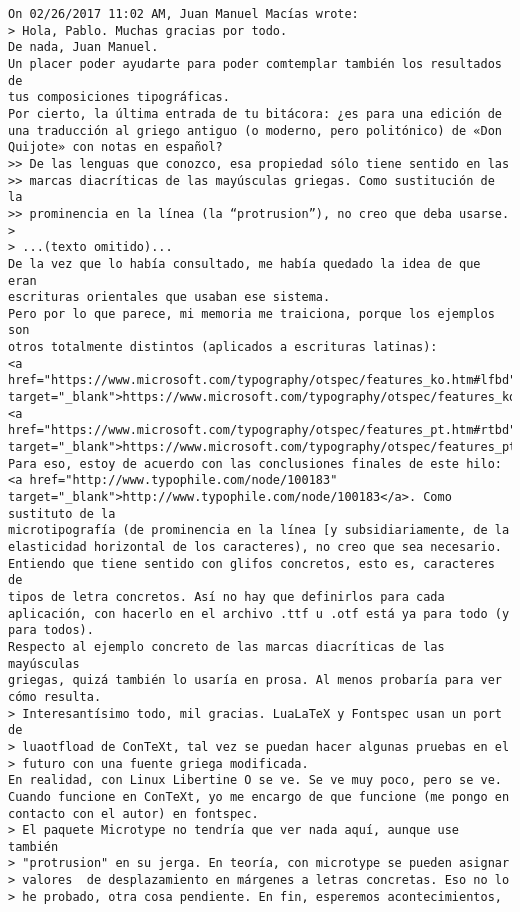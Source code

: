 \documentclass[a4paper,10pt]{article}
\begin{document}
\begin{lstlisting}
On 02/26/2017 11:02 AM, Juan Manuel Macías wrote:
> Hola, Pablo. Muchas gracias por todo.
De nada, Juan Manuel.
Un placer poder ayudarte para poder comtemplar también los resultados de
tus composiciones tipográficas.
Por cierto, la última entrada de tu bitácora: ¿es para una edición de
una traducción al griego antiguo (o moderno, pero politónico) de «Don
Quijote» con notas en español?
>> De las lenguas que conozco, esa propiedad sólo tiene sentido en las
>> marcas diacríticas de las mayúsculas griegas. Como sustitución de la
>> prominencia en la línea (la “protrusion”), no creo que deba usarse.
> 
> ...(texto omitido)...
De la vez que lo había consultado, me había quedado la idea de que eran
escrituras orientales que usaban ese sistema.
Pero por lo que parece, mi memoria me traiciona, porque los ejemplos son
otros totalmente distintos (aplicados a escrituras latinas):
<a href="https://www.microsoft.com/typography/otspec/features_ko.htm#lfbd" target="_blank">https://www.microsoft.com/typography/otspec/features_ko.htm#lfbd</a>
<a href="https://www.microsoft.com/typography/otspec/features_pt.htm#rtbd" target="_blank">https://www.microsoft.com/typography/otspec/features_pt.htm#rtbd</a>
Para eso, estoy de acuerdo con las conclusiones finales de este hilo:
<a href="http://www.typophile.com/node/100183" target="_blank">http://www.typophile.com/node/100183</a>. Como sustituto de la
microtipografía (de prominencia en la línea [y subsidiariamente, de la
elasticidad horizontal de los caracteres), no creo que sea necesario.
Entiendo que tiene sentido con glifos concretos, esto es, caracteres de
tipos de letra concretos. Así no hay que definirlos para cada
aplicación, con hacerlo en el archivo .ttf u .otf está ya para todo (y
para todos).
Respecto al ejemplo concreto de las marcas diacríticas de las mayúsculas
griegas, quizá también lo usaría en prosa. Al menos probaría para ver
cómo resulta.
> Interesantísimo todo, mil gracias. LuaLaTeX y Fontspec usan un port de
> luaotfload de ConTeXt, tal vez se puedan hacer algunas pruebas en el
> futuro con una fuente griega modificada.
En realidad, con Linux Libertine O se ve. Se ve muy poco, pero se ve.
Cuando funcione en ConTeXt, yo me encargo de que funcione (me pongo en
contacto con el autor) en fontspec.
> El paquete Microtype no tendría que ver nada aquí, aunque use también
> "protrusion" en su jerga. En teoría, con microtype se pueden asignar
> valores  de desplazamiento en márgenes a letras concretas. Eso no lo
> he probado, otra cosa pendiente. En fin, esperemos acontecimientos,

\end{lstlisting}
\end{document}
